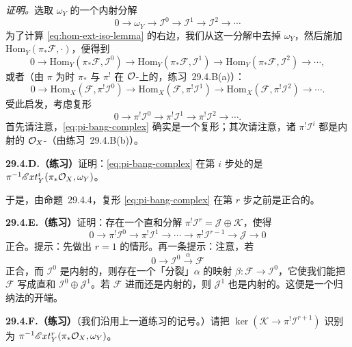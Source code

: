 \emph{证明。}\quad 选取 $\omega_Y$ 的一个内射分解
\[
0\longrightarrow\omega_Y\longrightarrow\mathscr{I}^0\longrightarrow\mathscr{I}^1\longrightarrow\mathscr{I}^2\longrightarrow\cdots
\]
为了计算 \eqref{eq:hom-ext-iso-lemma} 的右边，我们从这一分解中去掉 $\omega_Y$，然后施加 $\mathrm{Hom}_Y(\pi_*\mathscr{F},\cdot)$，便得到
\[
0\longrightarrow\mathrm{Hom}_Y(\pi_*\mathscr{F},\mathscr{I}^0)\longrightarrow\mathrm{Hom}_Y(\pi_*\mathscr{F},\mathscr{I}^1)\longrightarrow\mathrm{Hom}_Y(\pi_*\mathscr{F},\mathscr{I}^2)\longrightarrow\cdots,
\]
或者（由 $\pi$ 为\trClosedEmbedding{}时 $\pi_*$ 与 $\pi^!$ 在 $\mathcal{O}$-\trModule{}上的\trAdjointness，\mbox{练习~29.4.B(a)}）：
\[
0\longrightarrow\mathrm{Hom}_X(\mathscr{F},\pi^!\mathscr{I}^0)\longrightarrow\mathrm{Hom}_X(\mathscr{F},\pi^!\mathscr{I}^1)\longrightarrow\mathrm{Hom}_X(\mathscr{F},\pi^!\mathscr{I}^2)\longrightarrow\cdots.
\]
受此启发，考虑复形
\begin{equation*}
\tag{29.4.5.2}\label{eq:pi-bang-complex}
0\longrightarrow\pi^!\mathscr{I}^0\longrightarrow\pi^!\mathscr{I}^1\longrightarrow\pi^!\mathscr{I}^2\longrightarrow\cdots.
\end{equation*}
首先请注意，\eqref{eq:pi-bang-complex} 确实是一个复形；其次请注意，诸 $\pi^!\mathscr{I}^i$ 都是内射的 $\mathcal{O}_X$-\trModule（由\mbox{练习~29.4.B(b)}）。

\textbf{29.4.D.（练习）}\quad 证明：\eqref{eq:pi-bang-complex} 在第 $i$ 步处的\trCohomology{}是 $\pi^{-1}\mathscr{E}xt^i_Y(\pi_*\mathcal{O}_X,\omega_Y)$。

于是，由\mbox{命题~29.4.4}，复形 \eqref{eq:pi-bang-complex} 在第 $r$ 步之前是正合的。

\textbf{29.4.E.（练习）}\quad 证明：存在一个直和分解 $\pi^!\mathscr{I}^r=\mathscr{J}\oplus\mathscr{K}$，使得
\[
0\longrightarrow\pi^!\mathscr{I}^0\longrightarrow\pi^!\mathscr{I}^1\longrightarrow\cdots\longrightarrow\pi^!\mathscr{I}^{r-1}\longrightarrow\mathscr{J}\longrightarrow 0
\]
正合。提示：先做出 $r=1$ 的情形。再一条提示：注意，若
\[
0\longrightarrow\mathscr{I}^0\overset{\alpha}{\longrightarrow}\mathscr{F}
\]
正合，而 $\mathscr{I}^0$ 是内射的，则存在一个「分裂」$\alpha$ 的映射 $\beta\colon\mathscr{F}\to\mathscr{I}^0$，它使我们能把 $\mathscr{F}$ 写成直和 $\mathscr{I}^0\oplus\mathscr{J}^1$。若 $\mathscr{F}$ 进而还是内射的，则 $\mathscr{J}^1$ 也是内射的。这便是一个归纳法的开端。

\textbf{29.4.F.（练习）}\quad （我们沿用上一道练习的记号。）请把 $\ker(\mathscr{K}\to\pi^!\mathscr{I}^{r+1})$ 识别为 $\pi^{-1}\mathscr{E}xt^r_Y(\pi_*\mathcal{O}_X,\omega_Y)$。

